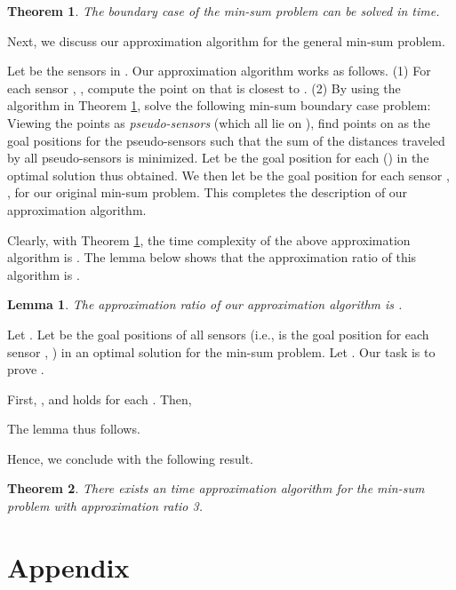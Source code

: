 \documentclass[11pt]{article}
\newenvironment{proof}{\noindent {\textbf{Proof:}}\rm}{\hfill 
\rm}
\newtheorem{Theo}{Theorem}
\newtheorem{Lem}{Lemma}
\begin{document}
\begin{Theo}\label{theo:40}
The boundary case of the min-sum problem can be solved in 
time.
\end{Theo}

Next, we discuss our approximation algorithm for the general min-sum
problem.

Let  be the sensors in . Our approximation
algorithm works as follows. (1) For each sensor ,
, compute the point  on  that is
closest to . (2) By using the algorithm in Theorem \ref{theo:40},
solve the following min-sum boundary case problem: Viewing the 
points  as {\em pseudo-sensors} (which all
lie on ), find  points on  as the goal
positions for the pseudo-sensors such that the sum of the distances
traveled by all  pseudo-sensors is minimized. Let  be the goal
position for each  () in the optimal
solution thus obtained. We then let  be the goal position for each sensor
, , for our original min-sum problem. This completes the
description of our approximation algorithm.

Clearly, with Theorem \ref{theo:40}, the time complexity of the
above approximation algorithm is . The lemma below shows that the
approximation ratio of this algorithm is .

\begin{Lem}\label{lem:40}
The approximation ratio of our approximation algorithm is .
\end{Lem}
\begin{proof}
Let . Let
 be the goal positions
of all sensors (i.e.,  is the goal position for each sensor
, ) in an optimal solution for the
min-sum problem. Let .
Our task is to prove .

First,   , and  holds for each . Then,

The lemma thus follows.
\end{proof}

Hence, we conclude with the following result.

\begin{Theo}
There exists an  time approximation algorithm for the
min-sum problem with approximation ratio 3.
\end{Theo}



\footnotesize
\baselineskip=11.0pt



\newpage
\normalsize
\appendix
\section*{Appendix}
\end{document}
